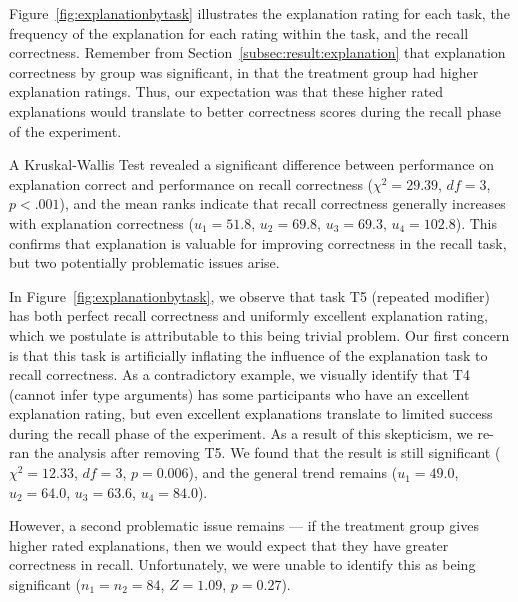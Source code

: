 \documentclass[conference]{IEEEtran}
\begin{document}
Figure~\ref{fig:explanationbytask} illustrates the explanation rating for each task, the frequency of the explanation for each rating within the task, and the recall correctness. Remember from Section~\ref{subsec:result:explanation} that explanation correctness by group was significant, in that the treatment group had higher explanation ratings. Thus, our expectation was that these higher rated explanations would translate to better correctness scores during the recall phase of the experiment.

A Kruskal-Wallis Test revealed a significant difference between performance on explanation correct and performance on recall correctness ($\chi^2 = 29.39$, $df = 3$, $p < .001$), and the mean ranks indicate that recall correctness generally increases with explanation correctness ($u_1 = 51.8$, $u_2 = 69.8$, $u_3 = 69.3$, $u_4 = 102.8$). This confirms that explanation is valuable for improving correctness in the recall task, but two potentially problematic issues arise.

In Figure~\ref{fig:explanationbytask}, we observe that task T5 (repeated modifier) has both perfect recall correctness and uniformly excellent explanation rating, which we postulate is attributable to this being trivial problem. Our first concern is that this task is artificially inflating the influence of the explanation task to recall correctness. As a contradictory example, we visually identify that T4 (cannot infer type arguments) has some participants who have an excellent explanation rating, but even excellent explanations translate to limited success during the recall phase of the experiment. As a result of this skepticism, we re-ran the analysis after removing T5. We found that the result is still significant ($\chi^2 = 12.33$, $df = 3$, $p = 0.006$), and the general trend remains ($u_1 = 49.0$, $u_2 = 64.0$, $u_3 = 63.6$, $u_4 = 84.0$).


However, a second problematic issue remains --- if the treatment group gives higher rated explanations, then we would expect that they have greater correctness in recall. Unfortunately, we were unable to identify this as being significant ($n_1 = n_2 = 84$, $Z = 1.09$, $p = 0.27$).
\end{document}

